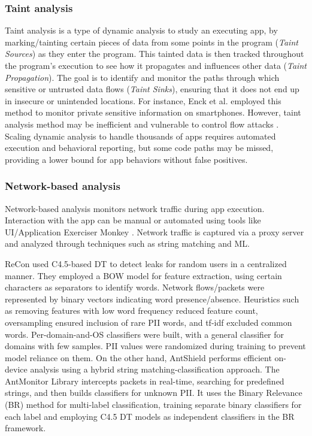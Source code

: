 \subsubsection{Taint analysis}
Taint analysis is a type of dynamic analysis to study an executing app, by marking/tainting certain pieces of data from some points in the program (\textit{Taint Sources}) as they enter the program. This tainted data is then tracked throughout the program's execution to see how it propagates and influences other data (\textit{Taint Propagation}). The goal is to identify and monitor the paths through which sensitive or untrusted data flows (\textit{Taint Sinks}), ensuring that it does not end up in insecure or unintended locations. For instance, Enck et al. \cite{taintdroid} employed this method to monitor private sensitive information on smartphones. However, taint analysis method may be inefficient and vulnerable to control flow attacks \cite{50ways}. Scaling dynamic analysis to handle thousands of apps requires automated execution and behavioral reporting, but some code paths may be missed, providing a lower bound for app behaviors without false positives.

\subsubsection{Network-based analysis}
Network-based analysis monitors network traffic during app execution. Interaction with the app can be manual or automated using tools like UI/Application Exerciser Monkey \cite{monkey}. Network traffic is captured via a proxy server and analyzed through techniques such as string matching and ML.

ReCon\cite{recon} used C4.5-based DT to detect leaks for random users in a centralized manner. They employed a BOW model for feature extraction, using certain characters as separators to identify words. Network flows/packets were represented by binary vectors indicating word presence/absence. Heuristics such as removing features with low word frequency reduced feature count, oversampling ensured inclusion of rare PII words, and tf-idf excluded common words. Per-domain-and-OS classifiers were built, with a general classifier for domains with few samples. PII values were randomized during training to prevent model reliance on them. On the other hand, AntShield \cite{antsh} performs efficient on-device analysis using a hybrid string matching-classification approach. The AntMonitor Library \cite{antmo} intercepts packets in real-time, searching for predefined strings, and then builds classifiers for unknown PII. It uses the Binary Relevance (BR) method for multi-label classification, training separate binary classifiers for each label and employing C4.5 DT models as independent classifiers in the BR framework.

